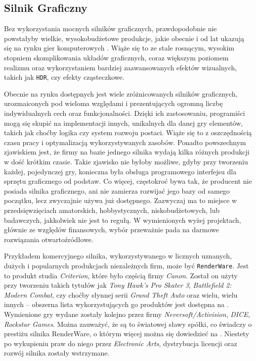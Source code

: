 \documentclass[11pt]{mwrep}
\begin{document}
    \subsection{Silnik Graficzny}

    Bez wykorzystania mocnych silników graficznych, prawdopodobnie nie powstałyby wielkie, wy\-so\-ko\-bud\-że\-to\-we produkcje, jakie obecnie i od lat ukazują się na rynku gier komputerowych . Wiąże się to ze stale rosnącym, wysokim stopniem skomplikowania układów graficznych, coraz większym poziomem realizmu oraz wykorzystaniem bardziej zaawansowanych efektów wizualnych, takich jak \texttt{HDR}, czy efekty cząsteczkowe.

    Obecnie na rynku dostępnych jest wiele zróżnicowanych silników graficznych, urozmaiconych pod wieloma względami i prezentujących ogromną liczbę indywidualnych cech oraz funkcjonalności. Dzięki ich zastosowaniu, programiści mogą się skupić na implementacji innych, unikalnych dla danej gry elementów, takich jak choćby logika czy system rozwoju postaci. Wiąże się to z oszczędnością czasu pracy i optymalizacją wykorzystywanych zasobów. Ponadto powszechnym zjawiskiem jest, że firmy na bazie jednego silnika wydają kilka różnych produkcji w dość krótkim czasie. Takie zjawisko nie byłoby możliwe, gdyby przy tworzeniu każdej, pojedynczej gry, konieczna była obsługa programowego interfejsu dla sprzętu graficznego od podstaw. Co więcej, częstokroć bywa tak, że producent nie posiada silnika graficznego, ani nie zamierza rozwijać jego bazy od samego początku, lecz zwyczajnie używa już dostępnego. Zazwyczaj ma to miejsce w przedsięwzięciach amatorskich, hobbystycznych, niskobudżetowych, lub badawczych, jakkolwiek nie jest to regułą. W wymienionych wyżej projektach, głównie ze względów finansowych, wybór przeważnie pada na darmowe rozwiązania otwartoźródłowe.


    Przykładem komercyjnego silnika, wykorzystywanego w licznych uznanych, dużych i popularnych produkcjach niezależnych firm, może być \texttt{RenderWare}. Jest to produkt studia \textit{Criterion}, które było częścią firmy \textit{Canon}. Został on użyty przy tworzeniu takich tytułów jak \textit{Tony Hawk's Pro Skater 3}, \textit{Battlefield 2: Modern Combat}, czy choćby słynnej serii \textit{Grand Theft Auto} oraz wielu, wielu innych -- obszerna lista wykorzystujących go produktów jest dostępna na \cite{renderware:list}. Wymienione gry wydane zostały kolejno przez firmy \textit{Neversoft/Activision}, \textit{DICE}, \textit{Rockstar Games}. Można zauważyć, że są to światowej sławy spółki, co świadczy o prestiżu silnika RenderWare, o którym więcej można się dowiedzieć na \cite{renderware}. Niestety po wykupieniu praw do niego przez \textit{Electronic Arts}, dystrybucja licencji oraz rozwój silnika zostały wstrzymane.
\end{document}
